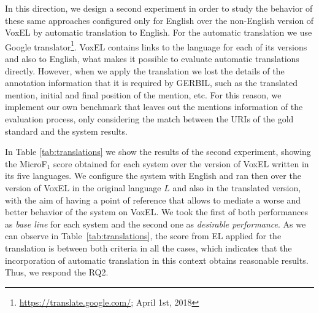 \documentclass{llncs}
\begin{document}
In this direction, we design a second experiment in order to study the behavior of these same approaches configured only for English over the non-English version of VoxEL by automatic translation to English. For the automatic translation we use Google translator\footnote{\url{https://translate.google.com/}; April 1st, 2018}. VoxEL contains links to the language for each of its versions and also to English, what makes it possible to evaluate automatic translations directly. However, when we apply the translation we lost the details of the annotation information that it is required by GERBIL, such as the translated mention, initial and final position of the mention, etc. For this reason, we implement our own benchmark that leaves out the mentions information of the evaluation process, only considering the match between the URIs of the gold standard and the system results. 

In Table \ref{tab:translations} we show the results of the second experiment, showing the MicroF$_1$ score obtained for each system over the version of VoxEL written in its five languages. We configure the system with English and ran then over the version of VoxEL in the original language $L$ and also in the translated version, with the aim of having a point of reference that allows to mediate a worse and better behavior of the system on VoxEL. We took the first of both performances as \textit{base line} for each system and the second one as \textit{desirable performance}. As we can observe in Table~\ref{tab:translations}, the score from EL applied for the translation is between both criteria in all the cases, which indicates that the incorporation of automatic translation in this context obtains reasonable results. Thus, we respond the RQ2.
\end{document}
